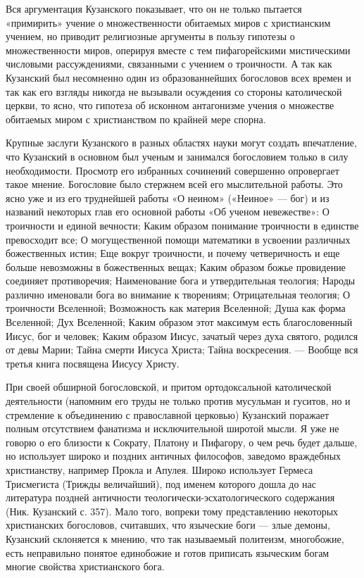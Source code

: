 Вся  аргументация Кузанского  показывает,  что он  не только  пытается
«примирить» учение  о множественности  обитаемых миров  с христианским
учением,  но  приводит  религиозные  аргументы  в  пользу  гипотезы  о
множественности   миров,   оперируя   вместе  с   тем   пифагорейскими
мистическими   числовыми  рассуждениями,   связанными   с  учением   о
троичности. А так как Кузанский был несомненно один из образованнейших
богословов  всех времен  и так  как  его взгляды  никогда не  вызывали
осуждения  со  стороны  католической  церкви, то  ясно,  что  гипотеза
об  исконном   антагонизме  учения  о  множестве   обитаемых  миром  с
христианством по крайней мере спорна.

Крупные  заслуги  Кузанского в  разных  областях  науки могут  создать
впечатление,  что   Кузанский  в  основном  был   ученым  и  занимался
богословием  только  в  силу  необходимости.  Просмотр  его  избранных
сочинений  совершенно   опровергает  такое  мнение.   Богословие  было
стержнем  всей  его  мыслительной  работы.  Это  ясно  уже  и  из  его
труднейшей  работы  «О  неином»  («Неиное»  ---  бог)  и  из  названий
некоторых  глав   его  основной  работы  «Об   ученом  невежестве»:  О
троичности  и  единой  вечности; Каким  образом  понимание  троичности
в  единстве  превосходит все;  О  могущественной  помощи математики  в
усвоении различных божественных истин; Еще вокруг троичности, и почему
четверичность  и еще  больше  невозможны в  божественных вещах;  Каким
образом божье  провидение соединяет противоречия; Наименование  бога и
утвердительная теология; Народы различно  именовали бога во внимание к
творениям; Отрицательная теология; О троичности Вселенной; Возможность
как материя Вселенной; Душа как  форма Вселенной; Дух Вселенной; Каким
образом этот максимум есть благословенный  Иисус, бог и человек; Каким
образом  Иисус, зачатый  через духа  святого, родился  от девы  Марии;
Тайна смерти Иисуса  Христа; Тайна воскресения. ---  Вообще вся третья
книга посвящена Иисусу Христу.

При своей обширной богословской,  и притом ортодоксальной католической
деятельности  (напомним  его  труды   не  только  против  мусульман  и
гуситов,  но  и  стремление  к объединению  с  православной  церковью)
Кузанский  поражает  полным  отсутствием  фанатизма  и  исключительной
широтой  мысли. Я  уже не  говорю о  его близости  к Сократу,  Платону
и  Пифагору,  о  чем  речь   будет  дальше,  но  использует  широко  и
поздних античных философов, заведомо враждебных христианству, например
Прокла  и  Апулея.  Широко   использует  Гермеса  Трисмегиста  (Трижды
величайший),  под  именем которого  дошла  до  нас литература  поздней
античности  теологически-эсхатологического содержания  (Ник. Кузанский
с. 357). Мало того,  вопреки тому представлению некоторых христианских
богословов, считавших,  что языческие боги ---  злые демоны, Кузанский
склоняется к  мнению, что  так называемый политеизм,  многобожие, есть
неправильно  понятое  единобожие  и готов  приписать  языческим  богам
многие свойства христианского бога.

